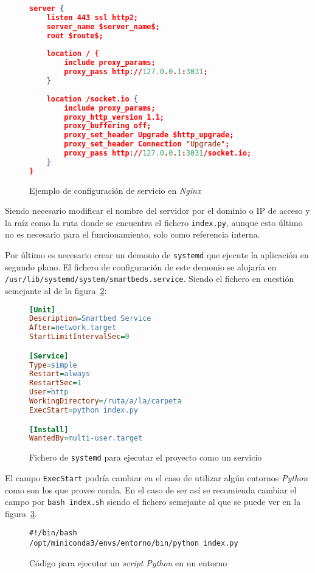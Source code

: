 \begin{figure}
	\centering
	\begin{lstlisting}[language=JSON]
server {
	listen 443 ssl http2;
	server_name $server_name$;
	root $route$;
	
	location / {
		include proxy_params;
		proxy_pass http://127.0.0.1:3031;
	}
	
	location /socket.io {
		include proxy_params;
		proxy_http_version 1.1;
		proxy_buffering off;
		proxy_set_header Upgrade $http_upgrade;
		proxy_set_header Connection "Upgrade";
		proxy_pass http://127.0.0.1:3031/socket.io;
	}
}
	\end{lstlisting}
	\caption{Ejemplo de configuración de servicio en \textit{Nginx}}
	\label{code:nginx}
\end{figure}


Siendo necesario modificar el nombre del servidor por el dominio o IP de acceso y la raíz como la ruta donde se encuentra el fichero \texttt{index.py}, aunque esto último no es necesario para el funcionamiento, solo como referencia interna.

Por último es necesario crear un demonio de \texttt{systemd} que ejecute la aplicación en segundo plano. El fichero de configuración de este demonio se alojaría en \texttt{/usr/lib/systemd/system/smartbeds.service}. Siendo el fichero en cuestión semejante al de la figura~\ref{code:systemd}:
\begin{figure}
	\centering
	\begin{lstlisting}[language={Ini}]
[Unit]
Description=Smartbed Service
After=network.target
StartLimitIntervalSec=0

[Service]
Type=simple
Restart=always
RestartSec=1
User=http
WorkingDirectory=/ruta/a/la/carpeta
ExecStart=python index.py

[Install]
WantedBy=multi-user.target
	\end{lstlisting}
	\caption{Fichero de \texttt{systemd} para ejecutar el proyecto como un servicio}
	\label{code:systemd}
\end{figure}


El campo \texttt{ExecStart} podría cambiar en el caso de utilizar algún entornos \textit{Python} como son los que provee conda. En el caso de ser así se recomienda cambiar el campo por \texttt{bash index.sh} siendo el fichero semejante al que se puede ver en la figura~\ref{fig:code-bash}.
\begin{figure}
	\begin{lstlisting}[language=bashb]
#!/bin/bash
/opt/miniconda3/envs/entorno/bin/python index.py
	\end{lstlisting}
	\caption{Código para ejecutar un \textit{script} \textit{Python} en un entorno}
	\label{fig:code-bash}
\end{figure}



